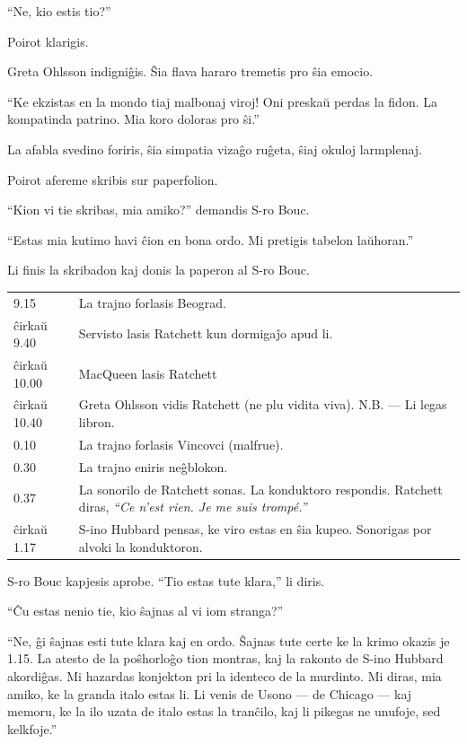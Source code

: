 ``Ne, kio estis tio?''

Poirot klarigis.

Greta Ohlsson indigniĝis. Ŝia flava hararo tremetis pro ŝia emocio.

``Ke ekzistas en la mondo tiaj malbonaj viroj! Oni preskaŭ perdas la fidon. La kompatinda patrino. Mia koro doloras pro ŝi.''

La afabla svedino foriris, ŝia simpatia vizaĝo ruĝeta, ŝiaj okuloj larmplenaj.

Poirot afereme skribis sur paperfolion.

``Kion vi tie skribas, mia amiko?'' demandis S-ro Bouc.

``Estas mia kutimo havi ĉion en bona ordo. Mi pretigis tabelon laŭhoran.''

Li finis la skribadon kaj donis la paperon al S-ro Bouc.

\begin{table}[htbp]
\begin{minipage}{\linewidth}
\setlength{\tymax}{0.5\linewidth}
\centering
\begin{tabular}{p{}p{}}
 9.15 & La trajno forlasis Beograd. \\
 ĉirkaŭ 9.40 & Servisto lasis Ratchett kun dormigaĵo apud li. \\
 ĉirkaŭ 10.00 & MacQueen lasis Ratchett \\
 ĉirkaŭ 10.40 & Greta Ohlsson vidis Ratchett (ne plu vidita viva). N.B. --- Li legas libron. \\
 0.10 & La trajno forlasis Vincovci (malfrue). \\
 0.30 & La trajno eniris neĝblokon. \\
 0.37 & La sonorilo de Ratchett sonas. La konduktoro respondis. Ratchett diras, \emph{``Ce n'est rien. Je me suis trompé.''} \\
 ĉirkaŭ 1.17 & S-ino Hubbard pensas, ke viro estas en ŝia kupeo. Sonorigas por alvoki la konduktoron. \\
\end{tabular}
\end{minipage}
\end{table}

S-ro Bouc kapjesis aprobe. ``Tio estas tute klara,'' li diris.

``Ĉu estas nenio tie, kio ŝajnas al vi iom stranga?''

``Ne, ĝi ŝajnas esti tute klara kaj en ordo. Ŝajnas tute certe ke la krimo okazis je 1.15. La atesto de la poŝhorloĝo tion montras, kaj la rakonto de S-ino Hubbard akordiĝas. Mi hazardas konjekton pri la identeco de la murdinto. Mi diras, mia amiko, ke la granda italo estas li. Li venis de Usono --- de Chicago --- kaj memoru, ke la ilo uzata de italo estas la tranĉilo, kaj li pikegas ne unufoje, sed kelkfoje.''

